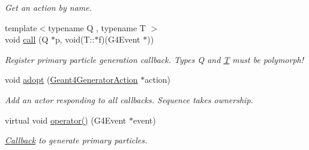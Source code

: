 \begin{DoxyCompactItemize}
\begin{DoxyCompactList}\small\item\em Get an action by name. \item\end{DoxyCompactList}\item 
{\footnotesize template$<$typename Q , typename T $>$ }\\void \hyperlink{class_d_d4hep_1_1_simulation_1_1_geant4_generator_action_sequence_a05f04216668a2736d720cf9a8a3e012c}{call} (Q $\ast$p, void(T::$\ast$f)(G4Event $\ast$))
\begin{DoxyCompactList}\small\item\em Register primary particle generation callback. Types Q and \hyperlink{class_t}{T} must be polymorph! \item\end{DoxyCompactList}\item 
void \hyperlink{class_d_d4hep_1_1_simulation_1_1_geant4_generator_action_sequence_ac6d847bdeeaa2b6bd46f1ae89fc15277}{adopt} (\hyperlink{class_d_d4hep_1_1_simulation_1_1_geant4_generator_action}{Geant4GeneratorAction} $\ast$action)
\begin{DoxyCompactList}\small\item\em Add an actor responding to all callbacks. Sequence takes ownership. \item\end{DoxyCompactList}\item 
virtual void \hyperlink{class_d_d4hep_1_1_simulation_1_1_geant4_generator_action_sequence_a60e6a124a4d378fbf6a980137f5290cf}{operator()} (G4Event $\ast$event)
\begin{DoxyCompactList}\small\item\em \hyperlink{class_d_d4hep_1_1_callback}{Callback} to generate primary particles. \item\end{DoxyCompactList}\end{DoxyCompactItemize}
